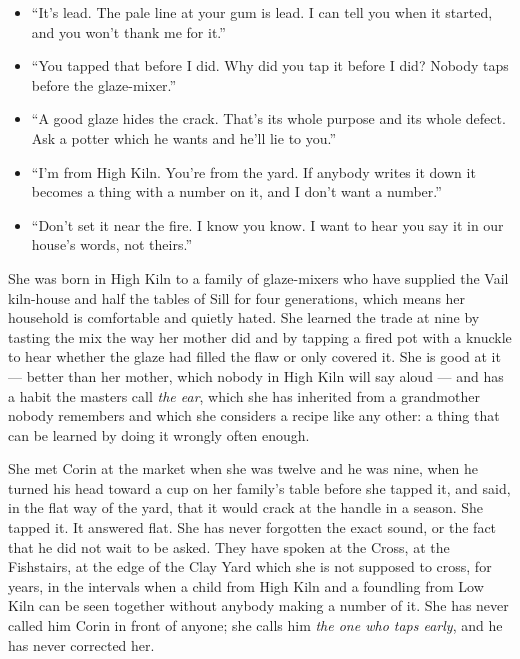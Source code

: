 \documentclass{design/chronicle}
\begin{document}
{\begin{itemize}[leftmargin=1.4em,itemsep=1pt,topsep=3pt,parsep=0pt]

\item “It’s lead. The pale line at your gum is lead. I can tell you when it started, and you won’t thank me for it.”

\item “You tapped that before I did. Why did you tap it before I did? Nobody taps before the glaze-mixer.”

\item “A good glaze hides the crack. That’s its whole purpose and its whole defect. Ask a potter which he wants and he’ll lie to you.”

\item “I’m from High Kiln. You’re from the yard. If anybody writes it down it becomes a thing with a number on it, and I don’t want a number.”

\item “Don’t set it near the fire. I know you know. I want to hear you say it in our house’s words, not theirs.”

\end{itemize}

She was born in High Kiln to a family of glaze-mixers who have supplied the Vail kiln-house and half the tables of Sill for four generations, which means her household is comfortable and quietly hated. She learned the trade at nine by tasting the mix the way her mother did and by tapping a fired pot with a knuckle to hear whether the glaze had filled the flaw or only covered it. She is good at it — better than her mother, which nobody in High Kiln will say aloud — and has a habit the masters call \emph{the ear}, which she has inherited from a grandmother nobody remembers and which she considers a recipe like any other: a thing that can be learned by doing it wrongly often enough.

She met Corin at the market when she was twelve and he was nine, when he turned his head toward a cup on her family’s table before she tapped it, and said, in the flat way of the yard, that it would crack at the handle in a season. She tapped it. It answered flat. She has never forgotten the exact sound, or the fact that he did not wait to be asked. They have spoken at the Cross, at the Fishstairs, at the edge of the Clay Yard which she is not supposed to cross, for years, in the intervals when a child from High Kiln and a foundling from Low Kiln can be seen together without anybody making a number of it. She has never called him Corin in front of anyone; she calls him \emph{the one who taps early}, and he has never corrected her.

}
\end{document}
